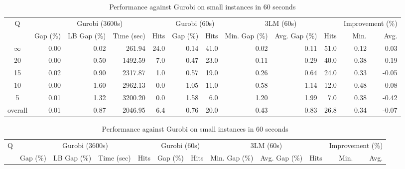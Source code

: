 \begin{table}[H]
\centering
\caption{Performance against Gurobi on small instances in 60 seconds}
\label{tab:3lm_resuts100T60}
\begin{tabular}{c rrrr rr rrr rr}
\toprule
       Q & \multicolumn{4}{c}{Gurobi (3600s)} & \multicolumn{2}{c}{Gurobi (60s)} & \multicolumn{3}{c}{3LM (60s)} & \multicolumn{2}{c}{Improvement (\%)} \\
         &       Gap (\%) & LB Gap (\%) & Time (sec) & Hits &     Gap (\%) & Hits & Min. Gap (\%) & Avg. Gap (\%) & Hits &             Min. &  Avg. \\
\cmidrule(lr){1-1} \cmidrule(lr){2-5} \cmidrule(lr){2-5} \cmidrule(lr){6-7} \cmidrule(lr){8-10} \cmidrule(lr){11-12}
$\infty$ &           0.00 &        0.02 &     261.94 & 24.0 &         0.14 & 41.0 &          0.02 &          0.11 & 51.0 &             0.12 &  0.03 \\
      20 &           0.00 &        0.50 &    1492.59 &  7.0 &         0.47 & 23.0 &          0.11 &          0.29 & 40.0 &             0.38 &  0.19 \\
      15 &           0.02 &        0.90 &    2317.87 &  1.0 &         0.57 & 19.0 &          0.26 &          0.64 & 24.0 &             0.33 & -0.05 \\
      10 &           0.00 &        1.60 &    2962.13 &  0.0 &         1.05 & 11.0 &          0.58 &          1.14 & 12.0 &             0.48 & -0.08 \\
       5 &           0.01 &        1.32 &    3200.20 &  0.0 &         1.58 &  6.0 &          1.20 &          1.99 &  7.0 &             0.38 & -0.42 \\
\midrule
 overall &           0.01 &        0.87 &    2046.95 &  6.4 &         0.76 & 20.0 &          0.43 &          0.83 & 26.8 &             0.34 & -0.07 \\
\bottomrule
\end{tabular}
\end{table}\begin{table}[H]
\centering
\caption{Performance against Gurobi on small instances in 60 seconds}
\label{tab:3lm_resuts100T60}
\begin{tabular}{c rrrr rr rrr rr}
\toprule
       Q & \multicolumn{4}{c}{Gurobi (3600s)} & \multicolumn{2}{c}{Gurobi (60s)} & \multicolumn{3}{c}{3LM (60s)} & \multicolumn{2}{c}{Improvement (\%)} \\
         &       Gap (\%) & LB Gap (\%) & Time (sec) & Hits &     Gap (\%) & Hits & Min. Gap (\%) & Avg. Gap (\%) & Hits &             Min. &  Avg. \\

\end{tabular}
\end{table}
